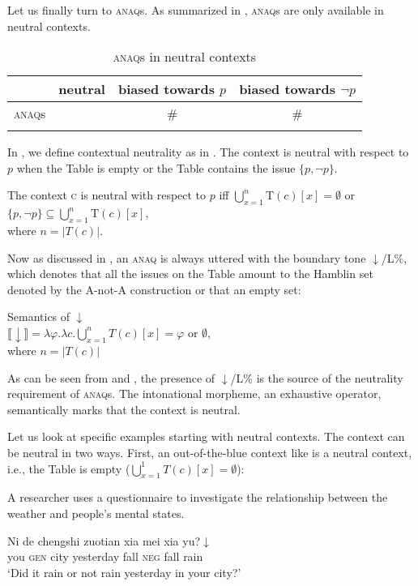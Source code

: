 \documentclass[output=paper,colorlinks,citecolor=brown]{langscibook}
\begin{document}
Let us finally turn to \textsc{anaq}s.   As summarized in ,  \textsc{anaq}s are only available in neutral contexts.

\begin{table}
	\begin{tabularx}{\textwidth}{lCCc}
	\lsptoprule
		&  neutral  & biased towards  $p$ & biased towards $\neg p$\\
		\midrule
		\textsc{anaq}s & \cmark & \# & \#\\
	\lspbottomrule
	\end{tabularx}
	\caption{\textsc{anaq}s in neutral contexts}
\label{tabanaq}
\end{table}


In , we define contextual neutrality as in .  The context is neutral with respect to $p$ when the Table is empty or the Table contains the issue $\{p, \neg p\}$.


\ea\label{def:conneut2} The context \textsc{c} is neutral with respect to $p$ iff $\bigcup_{x=1}^{n}\mathrm{T}(c)[x]  = \emptyset$ or $\{p, \neg p\}\subseteq\bigcup_{x=1}^{n}\mathrm{T}(c)[x]$,\\
 where $n=|T(c)|$.
\z

Now as discussed in , an \textsc{anaq} is always uttered with the boundary tone  $\downarrow$/L\%, which denotes that all the issues on the Table amount to the Hamblin set denoted by the A-not-A construction or that an empty set:

\ea\label{dl2} Semantics of $\downarrow$\\
$\llbracket\downarrow\rrbracket = \lambda \varphi. \lambda {c}. \bigcup_{x=1}^n{T}({c})[x]  = \varphi$ or $\emptyset$,\\
where $n=|T({c})|$
\z


As can be seen from  and , the presence of $\downarrow$/L\% is the source of the neutrality requirement of \textsc{anaq}s.  The intonational morpheme, an exhaustive operator, semantically marks that the context is neutral.


Let us look at specific examples starting with neutral contexts.  The context can be neutral in two ways.  First, an out-of-the-blue context like  is a neutral context, i.e., the Table is empty ($\bigcup_{x=1}^{1}{T}({c})[{x}] = \emptyset$):
	
\ea\label{outofb} A researcher uses a questionnaire to investigate the relationship between the weather and people's mental states. 
\begin{xlist}
 \gll Ni de chengshi zuotian  xia mei xia yu?$\downarrow$ \\
you \textsc{gen} city yesterday fall \textsc{neg} fall rain \\
\glt `Did it rain or not rain  yesterday in your city?'
\end{xlist}
\z
	
\end{document}

